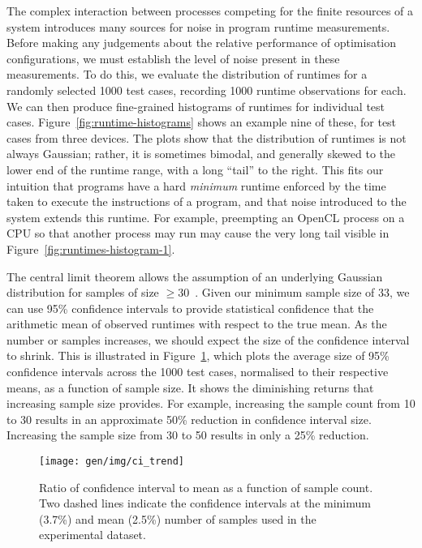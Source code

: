The complex interaction between processes competing for the finite
resources of a system introduces many sources for noise in program
runtime measurements. Before making any judgements about the relative
performance of optimisation configurations, we must establish the
level of noise present in these measurements. To do this, we evaluate
the distribution of runtimes for a randomly selected 1000 test cases,
recording 1000 runtime observations for each. We can then produce
fine-grained histograms of runtimes for individual test
cases. Figure~\ref{fig:runtime-histograms} shows an example nine of
these, for test cases from three devices. The plots show that the
distribution of runtimes is not always Gaussian; rather, it is
sometimes bimodal, and generally skewed to the lower end of the
runtime range, with a long ``tail'' to the right. This fits our
intuition that programs have a hard \emph{minimum} runtime enforced by
the time taken to execute the instructions of a program, and that
noise introduced to the system extends this runtime. For example,
preempting an OpenCL process on a CPU so that another process may run
may cause the very long tail visible in
Figure~\ref{fig:runtimes-histogram-1}.

The central limit theorem allows the assumption of an underlying
Gaussian distribution for samples of size $\ge 30$~\cite{Georges2007}.
Given our minimum sample size of 33, we can use 95\% confidence
intervals to provide statistical confidence that the arithmetic mean
of observed runtimes with respect to the true mean. As the number or
samples increases, we should expect the size of the confidence
interval to shrink. This is illustrated in Figure~\ref{fig:ci-trends},
which plots the average size of 95\% confidence intervals across the
1000 test cases, normalised to their respective means, as a function
of sample size. It shows the diminishing returns that increasing
sample size provides. For example, increasing the sample count from 10
to 30 results in an approximate 50\% reduction in confidence interval
size. Increasing the sample size from 30 to 50 results in only a 25\%
reduction.

\begin{figure}
\centering
\texttt{[image: gen/img/ci\_trend]}
\caption[Confidence interval size vs.\ sample count]{%
  Ratio of confidence interval to mean as a function of sample
  count. Two dashed lines indicate the confidence intervals at the
  minimum (3.7\%) and mean (2.5\%) number of samples used in the
  experimental dataset.%
}
\label{fig:ci-trends}
\end{figure}

